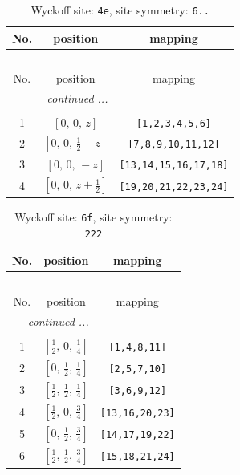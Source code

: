 \documentclass[fleqn,8pt]{jsarticle}
\begin{document}
\renewcommand{\arraystretch}{1.2}
\begin{longtable}{ccc}
\caption{Wyckoff site: {\tt 4e}, site symmetry: {\tt 6..}}
 \\
 \hline \hline
No. & position & mapping \\ \hline \endfirsthead

\multicolumn{2}{l}{\tablename\ \thetable{}} \\
 \hline \hline
No. & position & mapping \\ \hline \endhead

 \hline \hline
\multicolumn{2}{r}{\footnotesize\it continued ...} \\ \endfoot

 \hline \hline
\multicolumn{2}{r}{} \\ \endlastfoot

1 & $\left[ 0,\, 0,\, z \right]$ & {\tt [1,2,3,4,5,6]} \\ \hline
2 & $\left[ 0,\, 0,\, \frac{1}{2} - z \right]$ & {\tt [7,8,9,10,11,12]} \\ \hline
3 & $\left[ 0,\, 0,\, - z \right]$ & {\tt [13,14,15,16,17,18]} \\ \hline
4 & $\left[ 0,\, 0,\, z + \frac{1}{2} \right]$ & {\tt [19,20,21,22,23,24]} \\
\end{longtable}
\renewcommand{\arraystretch}{1.2}
\begin{longtable}{ccc}
\caption{Wyckoff site: {\tt 6f}, site symmetry: {\tt 222}}
 \\
 \hline \hline
No. & position & mapping \\ \hline \endfirsthead

\multicolumn{2}{l}{\tablename\ \thetable{}} \\
 \hline \hline
No. & position & mapping \\ \hline \endhead

 \hline \hline
\multicolumn{2}{r}{\footnotesize\it continued ...} \\ \endfoot

 \hline \hline
\multicolumn{2}{r}{} \\ \endlastfoot

1 & $\left[ \frac{1}{2},\, 0,\, \frac{1}{4} \right]$ & {\tt [1,4,8,11]} \\ \hline
2 & $\left[ 0,\, \frac{1}{2},\, \frac{1}{4} \right]$ & {\tt [2,5,7,10]} \\ \hline
3 & $\left[ \frac{1}{2},\, \frac{1}{2},\, \frac{1}{4} \right]$ & {\tt [3,6,9,12]} \\ \hline
4 & $\left[ \frac{1}{2},\, 0,\, \frac{3}{4} \right]$ & {\tt [13,16,20,23]} \\ \hline
5 & $\left[ 0,\, \frac{1}{2},\, \frac{3}{4} \right]$ & {\tt [14,17,19,22]} \\ \hline
6 & $\left[ \frac{1}{2},\, \frac{1}{2},\, \frac{3}{4} \right]$ & {\tt [15,18,21,24]} \\
\end{longtable}
\end{document}
